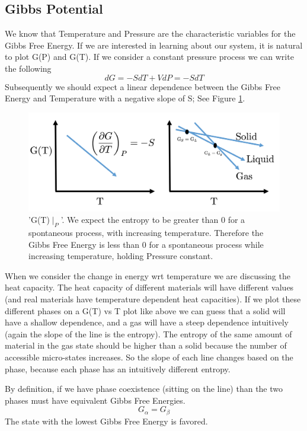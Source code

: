 \documentclass{article}
\begin{document}
\subsection*{Gibbs Potential}
We know that Temperature and Pressure are the characteristic variables for the Gibbs Free Energy.
If we are interested in learning about our system, it is natural to plot G(P) and G(T). 
If we consider a constant pressure process we can write the following
\begin{equation}
    dG = -SdT + VdP = -SdT
\end{equation}
Subsequently we should expect a linear dependence between the Gibbs Free Energy and Temperature with a negative slope of S; See Figure \ref{fig:gibbs}. 
\begin{figure}[! h]
    \centering
    \includegraphics[width=15cm]{gibbs.png}
    \caption{'G(T)$\mid_P$'. We expect the entropy to be greater than 0 for a spontaneous process, with increasing temperature. Therefore the Gibbs Free Energy is less than 0 for a spontaneous process while increasing temperature, holding Pressure constant.}
    \label{fig:gibbs}
\end{figure}

When we consider the change in energy wrt temperature we are discussing the heat capacity. 
The heat capacity of different materials will have different values (and real materials have temperature dependent heat capacities). 
If we plot these different phases on a G(T) vs T plot like above we can guess that a solid will have a shallow dependence, and a gas will have a steep dependence intuitively (again the slope of the line is the entropy). 
The entropy of the same amount of material in the gas state should be higher than a solid because the number of accessible micro-states increases. 
So the slope of each line changes based on the phase, because each phase has an intuitively different entropy. 

By definition, if we have phase coexistence (sitting on the line) than the two phases must have equivalent Gibbs Free Energies.
\begin{equation}
    G_\alpha = G_\beta
\end{equation}
The state with the lowest Gibbs Free Energy is favored. 
\end{document}
